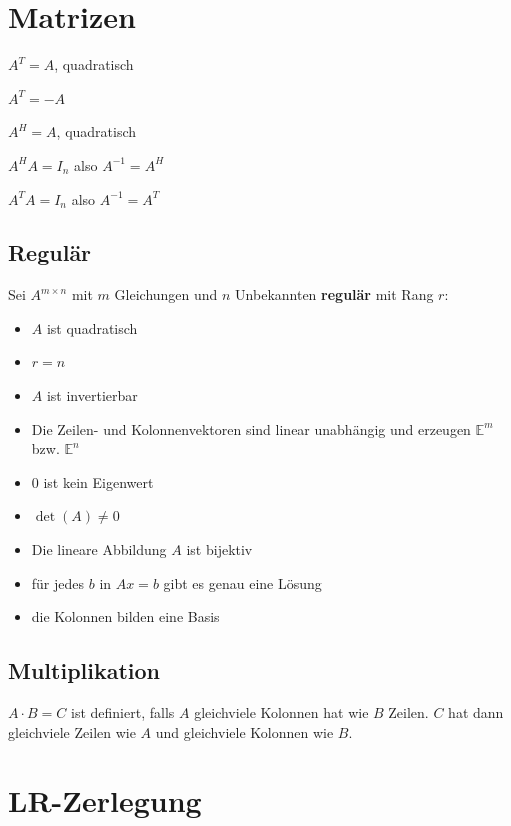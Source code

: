 \documentclass[11pt]{article}
\begin{document}
\section{Matrizen}

\begin{description}[labelindent=16pt,style=multiline,leftmargin=4.5cm, noitemsep]
	\item[symmetrisch] $A^T = A$, quadratisch
	\item[schiefsymmetrisch] $A^T = -A$
	\item[hermitesch] $A^H = A$, quadratisch
	\item[unitär] $A^HA = I_n$ also $A^{-1} = A^H$
	\item[orthogonal] $A^TA = I_n$ also $A^{-1} = A^T$
\end{description}

\subsection{Regulär}

Sei $A^{m\times n}$ mit $m$ Gleichungen und $n$ Unbekannten \textbf{regulär} mit Rang $r$:
\begin{itemize}[noitemsep]
	\item $A$ ist quadratisch
	\item $r = n$
	\item $A$ ist invertierbar
	\item Die Zeilen- und Kolonnenvektoren sind linear unabhängig und erzeugen $\mathbb{E}^m$ bzw. $\mathbb{E}^n$
	\item $0$ ist kein Eigenwert
	\item $\det(A) \neq 0$
	\item Die lineare Abbildung $A$ ist bijektiv
	\item für jedes $b$ in $Ax = b$ gibt es genau eine Lösung
	\item die Kolonnen bilden eine Basis
\end{itemize}

\subsection{Multiplikation}

$A \cdot B = C$ ist definiert, falls $A$ gleichviele Kolonnen hat wie $B$ Zeilen. $C$ hat dann gleichviele Zeilen wie $A$ und gleichviele Kolonnen wie $B$.
	
\section{LR-Zerlegung}
\end{document}
